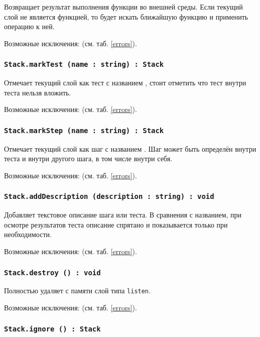 Возвращает результат выполнения функции во внешней среды. Если текущий слой не является функцией, то будет искать ближайшую функцию и применить операцию к ней.

Возможные исключения:  (см. таб. \ref{errors}).

\subsubsection{\lstinline|Stack.markTest (name : string) : Stack|}

Отмечает текущий слой как тест с названием , стоит отметить что тест внутри теста нельзя вложить.

Возможные исключения:  (см. таб. \ref{errors}).

\subsubsection{\lstinline|Stack.markStep (name : string) : Stack|}

Отмечает текущий слой как шаг с названием . Шаг может быть определён внутри теста и внутри другого шага, в том числе внутри себя.

Возможные исключения:  (см. таб. \ref{errors}).

\subsubsection{\lstinline|Stack.addDescription (description : string) : void|}

Добавляет текстовое описание шага или теста. В сравнения с названием, при осмотре результатов теста описание спрятано и показывается только при необходимости.

Возможные исключения:  (см. таб. \ref{errors}).

\subsubsection{\lstinline|Stack.destroy () : void|}

Полностью удаляет с памяти слой типа \lstinline|listen|.

Возможные исключения:  (см. таб. \ref{errors}).

\subsubsection{\lstinline|Stack.ignore () : Stack|}

